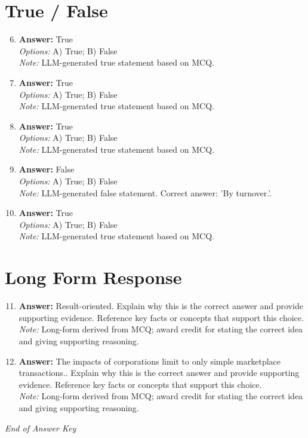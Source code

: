 \documentclass[12pt]{article}
\begin{document}
\section*{True / False}
\begin{enumerate}[label=\arabic*.]
\setcounter{enumi}{5}
\item \textbf{Answer:} True
\\ \textit{Options:} A) True; B) False
\\ \textit{Note:} LLM-generated true statement based on MCQ.
\item \textbf{Answer:} True
\\ \textit{Options:} A) True; B) False
\\ \textit{Note:} LLM-generated true statement based on MCQ.
\item \textbf{Answer:} True
\\ \textit{Options:} A) True; B) False
\\ \textit{Note:} LLM-generated true statement based on MCQ.
\item \textbf{Answer:} False
\\ \textit{Options:} A) True; B) False
\\ \textit{Note:} LLM-generated false statement. Correct answer: 'By turnover.'.
\item \textbf{Answer:} True
\\ \textit{Options:} A) True; B) False
\\ \textit{Note:} LLM-generated true statement based on MCQ.
\end{enumerate}

\section*{Long Form Response}
\begin{enumerate}[label=\arabic*.]
\setcounter{enumi}{10}
\item \textbf{Answer:} Result-oriented. Explain why this is the correct answer and provide supporting evidence. Reference key facts or concepts that support this choice.
\\ \textit{Note:} Long-form derived from MCQ; award credit for stating the correct idea and giving supporting reasoning.
\item \textbf{Answer:} The impacts of corporations limit to only simple marketplace transactions.. Explain why this is the correct answer and provide supporting evidence. Reference key facts or concepts that support this choice.
\\ \textit{Note:} Long-form derived from MCQ; award credit for stating the correct idea and giving supporting reasoning.
\end{enumerate}

\vfill
\noindent\textit{End of Answer Key}
\end{document}
